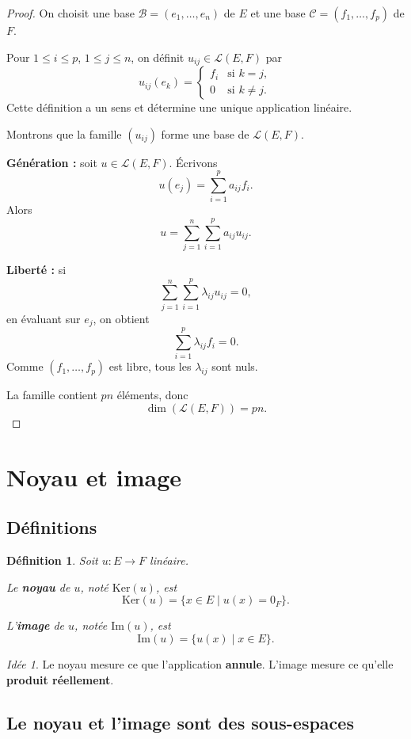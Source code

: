 \documentclass[11pt,a4paper]{article}
\newtheorem{definition}{Définition}[section]
\theoremstyle{remark}
\newtheorem*{idee}{Idée}
\newcommand{\Ker}{\mathrm{Ker}}
\newcommand{\Img}{\mathrm{Im}}
\newcommand{\Lin}{\mathcal{L}}
\begin{document}
\begin{proof}
On choisit une base \(\mathcal B=(e_1,\dots,e_n)\) de \(E\) et une base \(\mathcal C=(f_1,\dots,f_p)\) de \(F\).

Pour \(1\le i\le p\), \(1\le j\le n\), on définit \(u_{ij}\in\Lin(E,F)\) par
\[
u_{ij}(e_k)=
\begin{cases}
f_i & \text{si } k=j,\\
0 & \text{si } k\neq j.
\end{cases}
\]
Cette définition a un sens et détermine une unique application linéaire.

Montrons que la famille \((u_{ij})\) forme une base de \(\Lin(E,F)\).

\textbf{Génération :} soit \(u\in \Lin(E,F)\). Écrivons
\[
u(e_j)=\sum_{i=1}^p a_{ij}f_i.
\]
Alors
\[
u=\sum_{j=1}^n\sum_{i=1}^p a_{ij}u_{ij}.
\]

\textbf{Liberté :} si
\[
\sum_{j=1}^n\sum_{i=1}^p \lambda_{ij}u_{ij}=0,
\]
en évaluant sur \(e_j\), on obtient
\[
\sum_{i=1}^p \lambda_{ij}f_i=0.
\]
Comme \((f_1,\dots,f_p)\) est libre, tous les \(\lambda_{ij}\) sont nuls.

La famille contient \(pn\) éléments, donc
\[
\dim(\Lin(E,F))=pn.
\]
\end{proof}

\section{Noyau et image}

\subsection{Définitions}

\begin{definition}
Soit \(u:E\to F\) linéaire.

Le \textbf{noyau} de \(u\), noté \(\Ker(u)\), est
\[
\Ker(u)=\{x\in E\mid u(x)=0_F\}.
\]

L’\textbf{image} de \(u\), notée \(\Img(u)\), est
\[
\Img(u)=\{u(x)\mid x\in E\}.
\]
\end{definition}

\begin{idee}
Le noyau mesure ce que l’application \textbf{annule}.  
L’image mesure ce qu’elle \textbf{produit réellement}.
\end{idee}

\subsection{Le noyau et l’image sont des sous-espaces}
\end{document}
